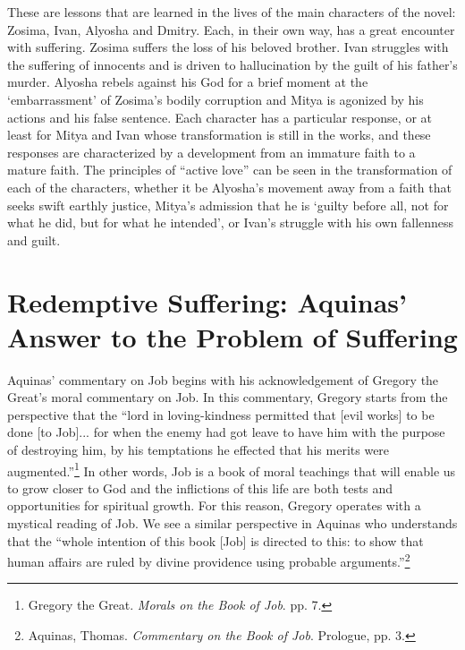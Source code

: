 These are lessons that are learned in the lives of the main characters of the novel: Zosima, Ivan, Alyosha and Dmitry. Each, in their own way, has a great encounter with suffering. Zosima suffers the loss of his beloved brother. Ivan struggles with the suffering of innocents and is driven to hallucination by the guilt of his father's murder. Alyosha rebels against his God for a brief moment at the `embarrassment' of Zosima's bodily corruption and Mitya is agonized by his actions and his false sentence. Each character has a particular response, or at least for Mitya and Ivan whose transformation is still in the works, and these responses are characterized by a development from an immature faith to a mature faith. The principles of ``active love'' can be seen in the transformation of each of the characters, whether it be Alyosha's movement away from a faith that seeks swift earthly justice, Mitya's admission that he is `guilty before all, not for what he did, but for what he intended', or Ivan's struggle with his own fallenness and guilt.



\section{Redemptive Suffering: Aquinas' Answer to the Problem of Suffering}
Aquinas' commentary on Job begins with his acknowledgement of Gregory the Great's moral commentary on Job. In this commentary, Gregory starts from the perspective that the ``lord in loving-kindness permitted that [evil works] to be done [to Job]... for when the enemy had got leave to have him with the purpose of destroying him, by his temptations he effected that his merits were augmented.''\footnote{Gregory the Great. \emph{Morals on the Book of Job}. pp. 7.} In other words, Job is a book of moral teachings that will enable us to grow closer to God and the inflictions of this life are both tests and opportunities for spiritual growth. For this reason, Gregory operates with a mystical reading of Job. We see a similar perspective in Aquinas who understands that the ``whole intention of this book [Job] is directed to this: to show that human affairs are ruled by divine providence using probable arguments.''\footnote{Aquinas, Thomas. \emph{Commentary on the Book of Job}. Prologue, pp. 3.}

